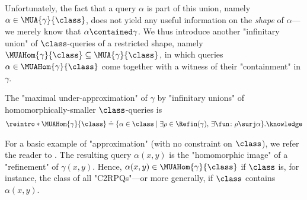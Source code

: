 Unfortunately, the fact that a query $\alpha$ is part of this union, namely $\alpha \in \MUA{\gamma}{\class}$, does not yield any useful information on the \emph{shape} of $\alpha$---we merely know that $\alpha \contained \gamma$. We thus introduce another "infinitary union" of $\class$-queries  of a restricted shape, namely $\MUAHom{\gamma}{\class} \subseteq \MUA{\gamma}{\class}$, in which queries $\alpha \in \MUAHom{\gamma}{\class}$ come together with a witness of their "containment" in $\gamma$.


\begin{definition}
    \AP The "maximal under-approximation" of $\gamma$ by "infinitary unions" of homomorphic\-ally-smaller $\class$-queries is\MUAHom
    \begin{align}
        \reintro*\MUAHom{\gamma}{\class} \defeq
        \{
            \alpha \in \class
            \mid
            \exists \rho \in \Refin(\gamma),\, \exists \fun\colon \rho \surj \alpha
        \}.
        \AP\label{eq:MUAHom}
    \end{align}
\end{definition}

For a basic example of "approximation" (with no constraint on $\class$),
we refer the reader to .
The resulting query $\alpha(x,y)$ is the "homomorphic image" of a "refinement" of
$\gamma(x,y)$. Hence, $\alpha(x,y) \in \MUAHom{\gamma}{\class}$ if $\class$ is, for instance, the class of all "C2RPQs"---or more generally, if $\class$ contains $\alpha(x,y)$.

